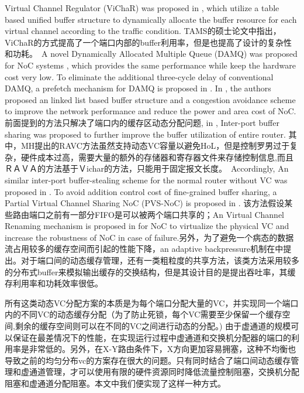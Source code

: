 ﻿\documentclass[10pt,journal]{IEEEtran}
\begin{document}
Virtual Channel Regulator (ViChaR) was proposed in \cite{NPKV06}, which utilize a table based unified buffer structure to dynamically allocate the buffer resource for each virtual channel according to the traffic condition. TAMS的硕士论文中指出，ViChaR的方式提高了一个端口内部的buffer利用率，但是也提高了设计的复杂性和功耗。　A novel Dynamically Allocated Multiple Queue (DAMQ) was proposed for NoC systems \cite{liu2006shared}, which provides the same performance while keep the hardware cost very low. To eliminate the additional three-cycle delay of conventional DAMQ, a prefetch mechanism for DAMQ is proposed in \cite{6310960}. In \cite{4555894}, the authors proposed an linked list based buffer structure and a congestion avoidance scheme to improve the network performance and reduce the power and area cost of NoC.　前面提到的方法只解决了端口内的缓存区动态分配问题,  in \cite{Neishaburi:2009:RAN:1531542.1531658}\cite{5770788}, Inter-port buffer sharing was proposed to further improve the buffer utilization of entire router. 其中，MH提出的RAVC方法虽然支持动态VC容量以避免HoL，但是控制罗男过于复杂，硬件成本过高，需要大量的额外的存储器和寄存器文件来存储控制信息,而且ＲＡＶＡ的方法基于Ｖichar的方法，只能用于固定报文长度。　Accordingly, An similar inter-port buffer-stealing scheme for the normal router without VC was proposed in \cite{5722177}. To avoid addition control cost of fine-grained buffer sharing, a Partial Virtual Channel Sharing NoC (PVS-NoC) is proposed in \cite{5739053}. 该方法假设某些路由端口之前有一部分FIFO是可以被两个端口共享的；An Virtual Channel Renaming mechanism is proposed in \cite{6296442} for NoC to virtualize the physical VC and increase the robustness of NoC in case of failure.另外，为了避免一个病态的数据流占用较多的缓存空间而引起的性能下降，an adaptive backpressure机制在\cite{BeckerJMD12}中提出。对于端口间的动态缓存管理，还有一类粗粒度的共享方法，该类方法采用较多的分布式buffer来模拟输出缓存的交换结构\cite{Soteriou:2009:HDS:1591872.1591936}，但是其设计目的是提出吞吐率，其缓存利用率和功耗效率很低。

所有这类动态VC分配方案的本质是为每个端口分配大量的VC，并实现同一个端口内的不同VC的动态缓存分配（为了防止死锁，每个VC需要至少保留一个缓存空间,剩余的缓存空间则可以在不同的VC之间进行动态的分配。) 由于虚通道的规模可以保证在最差情况下的性能，在实现运行过程中虚通道和交换机分配器的端口的利用率是非常低的。另外，在X-Y路由条件下，X方向更加容易拥塞，这种不均衡也导致之前的均匀分布vc的方案存在很大的问题。只有同时结合了端口间动态缓存管理和虚通道管理，才可以使用有限的硬件资源同时降低流量控制阻塞，交换机分配阻塞和虚通道分配阻塞。本文中我们便实现了这样一种方式。
\end{document}

